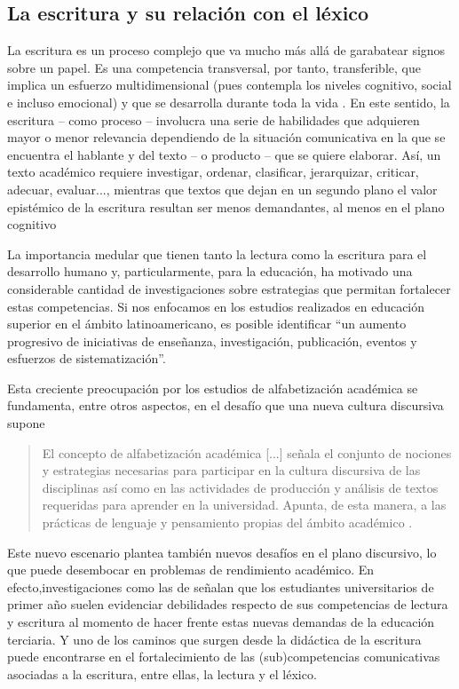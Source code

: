\documentclass{textolivre-html}
\begin{document}
\subsection{La escritura y su relación con el léxico}\label{sec-la-escr}
La escritura es un proceso complejo que va mucho más allá de garabatear
signos sobre un papel. Es una competencia transversal, por tanto, transferible,
que implica un esfuerzo multidimensional (pues contempla los niveles cognitivo,
social e incluso emocional) y que se desarrolla durante toda la vida \cite{Balta2018}.
En este sentido, la escritura – como proceso – involucra una serie de
habilidades que adquieren mayor o menor relevancia dependiendo de la situación
comunicativa en la que se encuentra el hablante y del texto – o producto – que
se quiere elaborar. Así, un texto académico requiere investigar, ordenar,
clasificar, jerarquizar, criticar, adecuar, evaluar..., mientras que textos que
dejan en un segundo plano el valor epistémico de la escritura resultan ser menos
demandantes, al menos en el plano cognitivo \cite{cantis2013,navarro}

La importancia medular que tienen tanto la lectura como la escritura para
el desarrollo humano y, particularmente, para la educación, ha motivado una
considerable cantidad de investigaciones sobre estrategias que permitan
fortalecer estas competencias. Si nos enfocamos en los estudios realizados en
educación superior en el ámbito latinoamericano, es posible identificar “un
aumento progresivo de iniciativas de enseñanza, investigación, publicación,
eventos y esfuerzos de sistematización”\cite{Navarro2016}.

Esta creciente preocupación por los estudios de alfabetización académica
se fundamenta, entre otros aspectos, en el desafío que una nueva cultura
discursiva supone
\begin{quote}
El concepto de alfabetización académica [...] señala el conjunto de nociones
y estrategias necesarias para participar en la cultura discursiva de las
disciplinas así como en las actividades de producción y análisis de textos
requeridas para aprender en la universidad. Apunta, de esta manera, a las
prácticas de lenguaje y pensamiento propias del ámbito académico \cite[p. 410]{cantis2003}.
\end{quote}

Este nuevo escenario plantea también nuevos desafíos en el plano discursivo,
lo que puede desembocar en problemas de rendimiento académico. En
efecto,investigaciones como las de \textcite{Ayala2019,ValdsLen2020} 
señalan que los estudiantes universitarios de primer año suelen evidenciar
debilidades respecto de sus competencias de lectura y escritura al momento de
hacer frente estas nuevas demandas de la educación terciaria. Y uno de los
caminos que surgen desde la didáctica de la escritura puede encontrarse en el
fortalecimiento de las (sub)competencias comunicativas asociadas a la escritura,
entre ellas, la lectura y el léxico.
\end{document}
